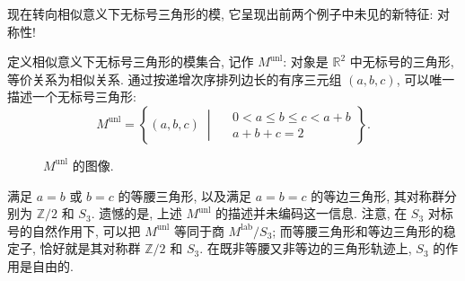 \begin{example}[相似意义下无标号的三角形]\label{src:1.2.12}
现在转向相似意义下无标号三角形的模, 它呈现出前两个例子中未见的新特征: 对称性!
\end{example}
定义相似意义下无标号三角形的模集合, 记作 $M^{\mathrm{unl}}$: 对象是 $\mathbb R^2$ 中无标号的三角形, 等价关系为相似关系. 通过按递增次序排列边长的有序三元组 $(a,b,c)$, 可以唯一描述一个无标号三角形: 
\begin{equation}\label{src:1.2.13}
M^{\mathrm{unl}}=\left\{(a,b,c)\;\middle|\;
\begin{aligned}
&0<a\leq b\leq c<a+b\\
&a+b+c=2
\end{aligned}\right\}.
\end{equation}
\begin{figure}[H]
\centering
\caption{$M^{\mathrm{unl}}$ 的图像.}\label{src:1.2.14}
\end{figure}
满足 $a=b$ 或 $b=c$ 的等腰三角形, 以及满足 $a=b=c$ 的等边三角形, 其对称群分别为 $\mathbb Z/2$ 和 $S_3$. 遗憾的是, 上述 $M^{\mathrm{unl}}$ 的描述并未编码这一信息. 注意, 在 $S_3$ 对标号的自然作用下, 可以把 $M^{\mathrm{unl}}$ 等同于商 $M^{\mathrm{lab}}/S_3$; 而等腰三角形和等边三角形的稳定子, 恰好就是其对称群 $\mathbb Z/2$ 和 $S_3$. 在既非等腰又非等边的三角形轨迹上, $S_3$ 的作用是自由的.
